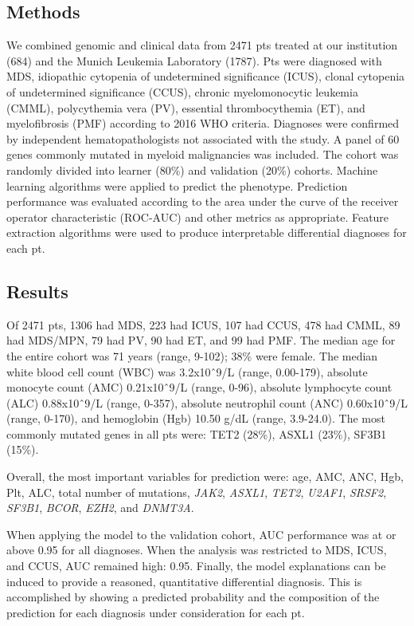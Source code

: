 \documentclass[
]{article}
\begin{document}
\hypertarget{methods}{%
\subsection{Methods}\label{methods}}

We combined genomic and clinical data from 2471 pts treated at our
institution (684) and the Munich Leukemia Laboratory (1787). Pts were
diagnosed with MDS, idiopathic cytopenia of undetermined significance
(ICUS), clonal cytopenia of undetermined significance (CCUS), chronic
myelomonocytic leukemia (CMML), polycythemia vera (PV), essential
thrombocythemia (ET), and myelofibrosis (PMF) according to 2016 WHO
criteria. Diagnoses were confirmed by independent hematopathologists not
associated with the study. A panel of 60 genes commonly mutated in
myeloid malignancies was included. The cohort was randomly divided into
learner (80\%) and validation (20\%) cohorts. Machine learning
algorithms were applied to predict the phenotype. Prediction performance
was evaluated according to the area under the curve of the receiver
operator characteristic (ROC-AUC) and other metrics as appropriate.
Feature extraction algorithms were used to produce interpretable
differential diagnoses for each pt.

\hypertarget{results}{%
\subsection{Results}\label{results}}

Of 2471 pts, 1306 had MDS, 223 had ICUS, 107 had CCUS, 478 had CMML, 89
had MDS/MPN, 79 had PV, 90 had ET, and 99 had PMF. The median age for
the entire cohort was 71 years (range, 9-102); 38\% were female. The
median white blood cell count (WBC) was 3.2x10ˆ9/L (range, 0.00-179),
absolute monocyte count (AMC) 0.21x10ˆ9/L (range, 0-96), absolute
lymphocyte count (ALC) 0.88x10ˆ9/L (range, 0-357), absolute neutrophil
count (ANC) 0.60x10ˆ9/L (range, 0-170), and hemoglobin (Hgb) 10.50 g/dL
(range, 3.9-24.0). The most commonly mutated genes in all pts were: TET2
(28\%), ASXL1 (23\%), SF3B1 (15\%).

Overall, the most important variables for prediction were: age, AMC,
ANC, Hgb, Plt, ALC, total number of mutations, \emph{JAK2},
\emph{ASXL1}, \emph{TET2}, \emph{U2AF1}, \emph{SRSF2}, \emph{SF3B1},
\emph{BCOR}, \emph{EZH2}, and \emph{DNMT3A}.

When applying the model to the validation cohort, AUC performance was at
or above 0.95 for all diagnoses. When the analysis was restricted to
MDS, ICUS, and CCUS, AUC remained high: 0.95. Finally, the model
explanations can be induced to provide a reasoned, quantitative
differential diagnosis. This is accomplished by showing a predicted
probability and the composition of the prediction for each diagnosis
under consideration for each pt.
\end{document}
